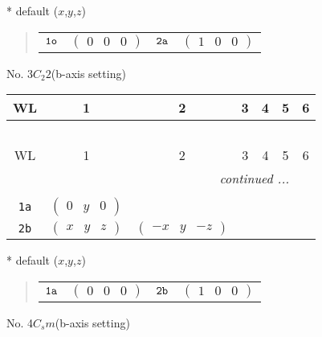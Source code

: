 \documentclass[fleqn,9pt,landscape]{jsarticle}
\begin{document}
* default ($x$,$y$,$z$)
\begin{quote}
\begin{tabular}{cccc}
$ {\tt 1o} $ & $ \begin{pmatrix} 0 & 0 & 0 \end{pmatrix} $ & $ {\tt 2a} $ & $ \begin{pmatrix} 1 & 0 & 0 \end{pmatrix} $
\end{tabular}
\end{quote}
\newpage
No. 3\quad$C_{2}$\quad$2$\quad(b-axis setting)\quad[ monoclinic ]
\begin{center}
\renewcommand{\arraystretch}{1.2}
\begin{longtable}{ccccccc}
 \hline \hline
WL & 1 & 2 & 3 & 4 & 5 & 6 \\ \hline \endfirsthead

\multicolumn{6}{l}{\tablename\ \thetable{}} \\
 \hline \hline
WL & 1 & 2 & 3 & 4 & 5 & 6 \\ \hline \endhead

 \hline \hline
\multicolumn{6}{r}{\footnotesize\it continued ...} \\ \endfoot

 \hline \hline
\multicolumn{6}{r}{} \\ \endlastfoot

{\tt 1a} & $ \begin{pmatrix} 0 & y & 0 \end{pmatrix} $ & $  $ \\ \hline
{\tt 2b} & $ \begin{pmatrix} x & y & z \end{pmatrix} $ & $ \begin{pmatrix} - x & y & - z \end{pmatrix} $ \\
\end{longtable}
\end{center}
* default ($x$,$y$,$z$)
\begin{quote}
\begin{tabular}{cccc}
$ {\tt 1a} $ & $ \begin{pmatrix} 0 & 0 & 0 \end{pmatrix} $ & $ {\tt 2b} $ & $ \begin{pmatrix} 1 & 0 & 0 \end{pmatrix} $
\end{tabular}
\end{quote}
\newpage
No. 4\quad$C_{s}$\quad$m$\quad(b-axis setting)\quad[ monoclinic ]
\end{document}
